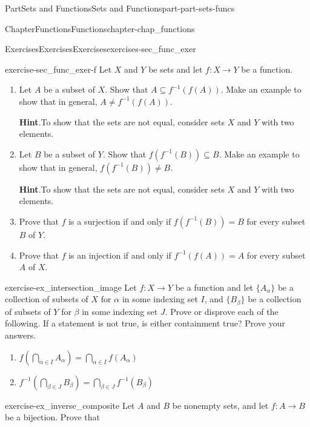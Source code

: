 \documentclass[oneside,10pt,]{book}
\newcommand{\blocktitlefont}{\relax}
\numberwithin{equation}{chapter}
\begin{document}
\begin{partptx}{Part}{Sets and Functions}{}{Sets and Functions}{}{}{part-part-sets-funcs}
\begin{chapterptx}{Chapter}{Functions}{}{Functions}{}{}{chapter-chap_functions}
\begin{exercises-section}{Exercises}{Exercises}{}{Exercises}{}{}{exercises-sec_func_exer}
\begin{divisionexercise}{6}{}{}{exercise-sec_func_exer-f}
Let \(X\) and \(Y\) be sets and let \(f: X \to Y\) be a function.%
\begin{enumerate}[font=\bfseries,label=(\alph*),ref=\alph*]%
\item{}Let \(A\) be a subset of \(X\). Show that \(A \subseteq f^{-1}(f(A))\). Make an example to show that in general, \(A \neq f^{-1}(f(A))\).%
\par\smallskip%
\noindent\textbf{\blocktitlefont Hint}.\hypertarget{hint-sec_func_exer-f-b-b}{}\quad{}To show that the sets are not equal, consider sets \(X\) and \(Y\) with two elements.%
\item{}Let \(B\) be a subset of \(Y\). Show that \(f(f^{-1}(B)) \subseteq B\). Make an example to show that in general, \(f(f^{-1}(B)) \neq B\).%
\par\smallskip%
\noindent\textbf{\blocktitlefont Hint}.\hypertarget{hint-sec_func_exer-f-c-b}{}\quad{}To show that the sets are not equal, consider sets \(X\) and \(Y\) with two elements.%
\item{}Prove that \(f\) is a surjection if and only if \(f(f^{-1}(B)) = B\) for every subset \(B\) of \(Y\).%
\item{}Prove that \(f\) is an injection if and only if \(f^{-1}(f(A)) = A\) for every subset \(A\) of \(X\).%
\end{enumerate}%
\end{divisionexercise}%
\begin{divisionexercise}{7}{}{}{exercise-ex_intersection_image}%
Let \(f : X \to Y\) be a function and let \(\{A_{\alpha}\}\) be a collection of subsets of \(X\) for \(\alpha\) in some indexing set \(I\), and \(\{B_{\beta}\}\) be a collection of subsets of \(Y\) for \(\beta\) in some indexing set \(J\). Prove or disprove each of the following. If a statement is not true, is either containment true? Prove your answers.%
\begin{enumerate}[font=\bfseries,label=(\alph*),ref=\alph*]%
\item{}\(f\left(\bigcap_{\alpha \in I} A_{\alpha}\right) = \bigcap_{\alpha \in I} f(A_{\alpha})\)%
\item{}\(f^{-1}\left(\bigcap_{\beta \in J} B_{\beta}\right) = \bigcap_{\beta \in J} f^{-1}(B_{\beta})\)%
\end{enumerate}%
\end{divisionexercise}%
\begin{divisionexercise}{8}{}{}{exercise-ex_inverse_composite}%
Let \(A\) and \(B\) be nonempty sets, and let \(f: A \to B\) be a bijection. Prove that%
\begin{enumerate}[font=\bfseries,label=(\alph*),ref=\alph*]%

\end{enumerate}
\end{divisionexercise}
\end{exercises-section}
\end{chapterptx}
\end{partptx}
\end{document}

